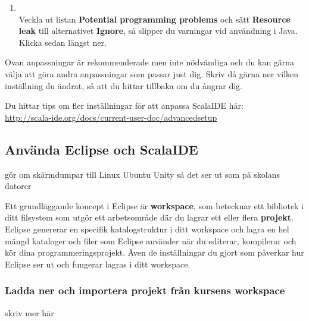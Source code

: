 \begin{enumerate}
\item \EclipsePrefs{}
\\ Veckla ut listan \textbf{Potential programming problems} och sätt \textbf{Resource leak} till alternativet \textbf{Ignore}, så slipper du varningar vid användning  i Java. Klicka sedan  längst ner.

\end{enumerate}

\noindent Ovan anpassningar är rekommenderade men inte nödvändiga och du kan gärna välja att göra andra anpassningar som passar just dig. Skriv då gärna ner vilken inställning du ändrat, så att du hittar tillbaka om du ångrar dig. 

Du hittar tips om fler inställningar för att anpassa ScalaIDE här: \\
\url{http://scala-ide.org/docs/current-user-doc/advancedsetup}



\subsection{Använda Eclipse och ScalaIDE}\label{appendix:ide:eclipse:use}

\TODO gör om skärmdumpar till Linux Ubuntu Unity så det ser ut som på skolans datorer

Ett grundläggande koncept i Eclipse är \textbf{workspace}, som betecknar ett bibliotek i ditt filsystem som utgör ett arbetsområde där du lagrar ett eller flera \textbf{projekt}. Eclipse genererar en specifik katalogstruktur i ditt workspace och lagra en hel mängd kataloger och filer som Eclipse använder när du editerar, kompilerar och kör dina programmeringsprojekt. Även de inställningar du gjort som påverkar hur Eclipse ser ut och fungerar lagras i ditt workspace.

\subsubsection{Ladda ner och importera projekt från kursens workspace}

\TODO skriv mer här

